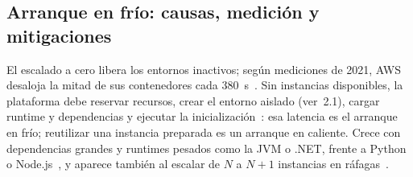\documentclass[12pt, letterpaper, table, xcdraw]{inf-pucv}
\begin{document}

\subsection{Arranque en frío: causas, medición y mitigaciones}
\label{sec:coldstart}
\label{subsec:arranque_en_frio}

El escalado a cero libera los entornos inactivos; según mediciones de 2021, AWS desaloja la mitad de sus contenedores cada 380~s~\cite{copik2021sebs}. Sin instancias disponibles, la plataforma debe reservar recursos, crear el entorno aislado (ver~2.1), cargar runtime y dependencias y ejecutar la inicialización~\cite{golec2025coldstart}: esa latencia es el arranque en frío; reutilizar una instancia preparada es un arranque en caliente. Crece con dependencias grandes y runtimes pesados como la JVM o .NET, frente a Python o Node.js~\cite{golec2025coldstart}, y aparece también al escalar de $N$ a $N+1$ instancias en ráfagas~\cite{giannini2022cpuboost}.
\end{document}
